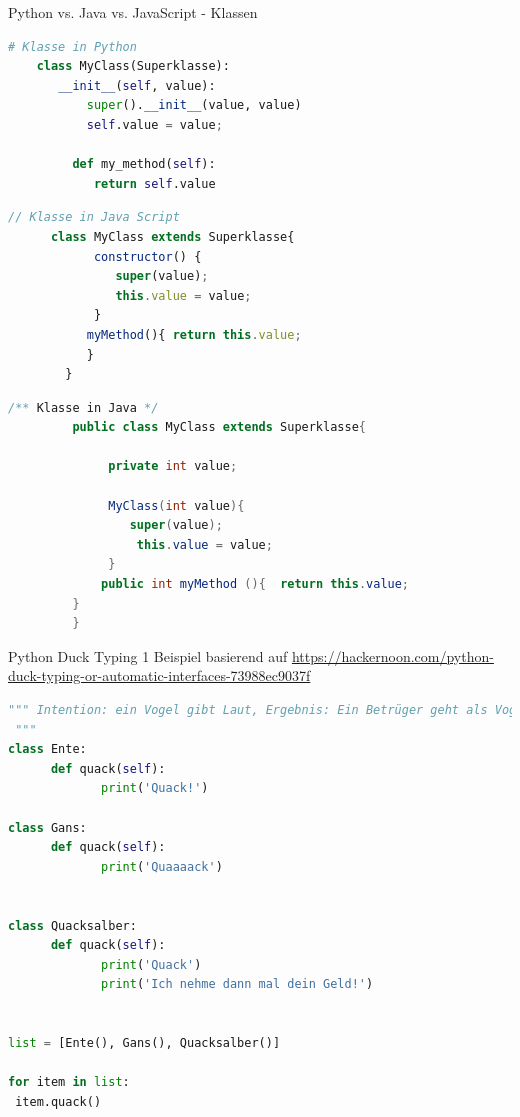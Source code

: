 \begin{frame}[fragile]{Python vs. Java vs. JavaScript - Klassen}
\begin{lstlisting}[language=Python]
	# Klasse in Python
 	class MyClass(Superklasse):
	   __init__(self, value):
	       super().__init__(value, value)
	       self.value = value;

	     def my_method(self):
	        return self.value

	\end{lstlisting}
\begin{lstlisting}[language=JavaScript]
       // Klasse in Java Script
 	  class MyClass extends Superklasse{
	        constructor() {
	           super(value);
	           this.value = value;
	        }
	       myMethod(){ return this.value;
	       }
	    }
\end{lstlisting}
\begin{lstlisting}[language=Java]
       /** Klasse in Java */
         public class MyClass extends Superklasse{

              private int value;

              MyClass(int value){
              	 super(value);
                  this.value = value;
              }
      	     public int myMethod (){  return this.value;
	     }
         }
\end{lstlisting}
\end{frame}


\begin{frame}[fragile]{Python Duck Typing 1}
Beispiel basierend auf \url{https://hackernoon.com/python-duck-typing-or-automatic-interfaces-73988ec9037f}
\begin{lstlisting}[language=Python]
 """ Intention: ein Vogel gibt Laut, Ergebnis: Ein Betrüger geht als Vogel durch, denn er kann ja quack machen und nimmt das Geld mit.
 """
class Ente:
	  def quack(self):
             print('Quack!')

class Gans:
	  def quack(self):
             print('Quaaaack')


class Quacksalber:
      def quack(self):
             print('Quack')
             print('Ich nehme dann mal dein Geld!')


list = [Ente(), Gans(), Quacksalber()]

for item in list:
 item.quack()

	\end{lstlisting}
\end{frame}

